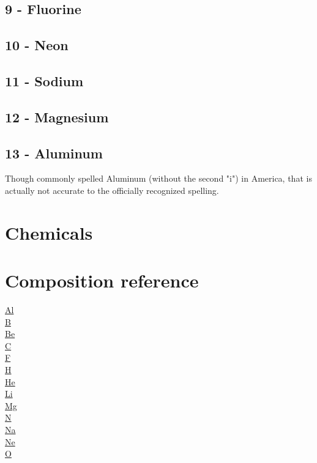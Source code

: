 \documentclass{book}
\begin{document}
\section{9 - Fluorine}
\label{sec:elem-fluorine}

\section{10 - Neon}
\label{sec:elem-neon}

\section{11 - Sodium}
\label{sec:elem-sodium}

\section{12 - Magnesium}
\label{sec:elem-magnesium}

\section{13 - Aluminum}
\label{sec:elem-aluminium}
Though commonly spelled Aluminum (without the second "i") in America, that is actually not accurate to the officially recognized spelling.

\chapter{Chemicals}

\chapter{Composition reference}
\begin{multicols}{3}
\noindent
\hyperref[sec:elem-aluminium]{Al}\\
\hyperref[sec:elem-boron]{B}\\
\hyperref[sec:elem-beryllium]{Be}\\
\hyperref[sec:elem-carbon]{C}\\
\hyperref[sec:elem-fluorine]{F}\\
\hyperref[sec:elem-hydrogen]{H}\\
\hyperref[sec:elem-helium]{He}\\
\hyperref[sec:elem-lithium]{Li}\\
\hyperref[sec:elem-magnesium]{Mg}\\
\hyperref[sec:elem-nitrogen]{N}\\
\hyperref[sec:elem-sodium]{Na}\\
\hyperref[sec:elem-neon]{Ne}\\
\hyperref[sec:elem-oxygen]{O}\\
\end{multicols}
\end{document}

